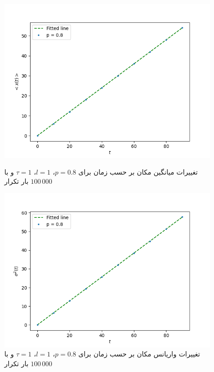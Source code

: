 \documentclass[11pt, a4paper]{article}
\begin{document}
\begin{figure}[h!]
\begin{minipage}[b]{0.48\textwidth}
    \includegraphics[width=\textwidth]{q2_x_0.8_100_10_100000.png}
    \caption{تغییرات میانگین مکان بر حسب زمان برای $p = 0.8$، $l = 1$، $\tau = 1$ و با $100\,000$ بار تکرار}
    \label{fig:q2_0.8_x}
  \end{minipage}
  \hfill
  \begin{minipage}[b]{0.48\textwidth}
    \includegraphics[width=\textwidth]{q2_var_0.8_100_10_100000.png}
    \caption{تغییرات واریانس مکان بر حسب زمان برای $p = 0.8$، $l = 1$، $\tau = 1$ و با $100\,000$ بار تکرار}
    \label{fig:q2_0.8_var}
  \end{minipage}
\end{figure}
\end{document}
